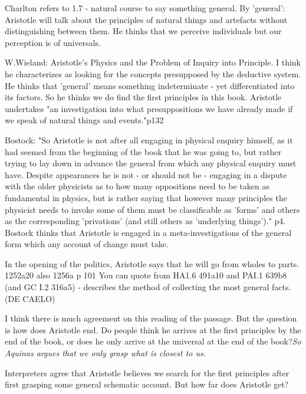 \documentclass[10pt, oneside]{book}
\begin{document}
Charlton refers to 1.7 - natural course to say something general. By 'general': Aristotle will talk about the principles of natural things and artefacts without distinguishing between them. He thinks that we perceive individuals but our perception is of universals.

W.Wieland: Aristotle's Physics and the Problem of Inquiry into Principle. I think he characterizes as looking for the concepts presupposed by the deductive system.  He thinks that 'general' means something indeterminate - yet differentiated into its factors. So he thinks we do find the first principles in this book. Aristotle undertakes "an investigation into what presuppositions we have already made if we speak of natural things and events."p132

Bostock: "So Aristotle is not after all engaging in physical enquiry himself, as it had seemed from the beginning of the book that he was going to, but rather trying to lay down in advance the general from which any physical enquiry must have. Despite appearances he is not - or should not be - engaging in a dispute with the older physicists as to how many oppositions need to be taken as fundamental in physics, but is rather saying that however many principles the physicist needs to invoke some of them must be classificable as 'forms' and others as the corresponding 'privations' (and still others as 'underlying things')." p4. Bostock thinks that Aristotle is engaged in a meta-investigations of the general form which any account of change must take.

In the opening of the politics, Aristotle says that he will go from wholes to parts. 1252a20 also 1256a p 101 You can quote from HA1.6 491a10 and PAI.1 639b8 (and GC I.2 316a5) - describes the method of collecting the most general facts. (DE CAELO)







I think there is much agreement on this reading of the passage. But the question is how does Aristotle end. Do people think he arrives at the first principles by the end of the book, or does he only arrive at the universal at the end of the book?\emph{So Aquinas argues that we only grasp what is closest to us.} 

Interpreters agree that Aristotle believes we search for the first principles after first grasping some general schematic account. But how far does Aristotle get? 
\end{document}
